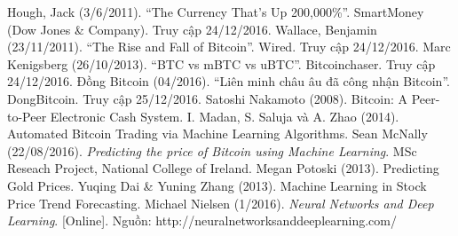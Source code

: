\documentclass[12pt,a4paper]{report}
\begin{document}
\pagebreak
\begin{thebibliography}{9}

Hough, Jack (3/6/2011). ``The Currency That's Up 200,000\%''. SmartMoney (Dow Jones \& Company). Truy cập 24/12/2016.
Wallace, Benjamin (23/11/2011). ``The Rise and Fall of Bitcoin''. Wired. Truy cập 24/12/2016.
Marc Kenigsberg (26/10/2013). ``BTC vs mBTC vs uBTC''. Bitcoinchaser. Truy cập 24/12/2016.
Đồng Bitcoin (04/2016). ``Liên minh châu âu đã công nhận Bitcoin''. DongBitcoin. Truy cập 25/12/2016.
Satoshi Nakamoto (2008). Bitcoin: A Peer-to-Peer Electronic Cash System.
I. Madan, S. Saluja và A. Zhao (2014). Automated Bitcoin Trading via Machine Learning Algorithms.
Sean McNally (22/08/2016). \emph{Predicting the price of Bitcoin using Machine Learning}. MSc Reseach Project, National College of Ireland.
Megan Potoski (2013). Predicting Gold Prices. 
Yuqing Dai \& Yuning Zhang (2013). Machine Learning in Stock Price Trend Forecasting.
Michael Nielsen (1/2016). \emph{Neural Networks and Deep Learning}. [Online]. Nguồn: http://neuralnetworksanddeeplearning.com/ 
\end{thebibliography}
\end{document}
